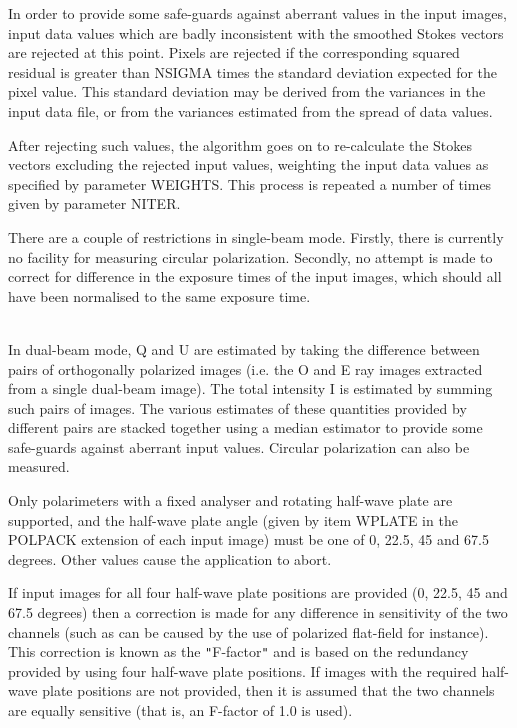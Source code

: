 \documentclass[twoside,11pt]{article}
\renewcommand{\_}{\texttt{\symbol{95}}}
\newcommand{\sstdiytopic}[2]{\item[{\hspace{-0.35em}#1\hspace{-0.35em}:}]
\mbox{} \\[1.3ex] #2}
\newcommand{\sstdiytopic}[2]{\item[{#1}] #2 }
\begin{document}
{{      In order to provide some safe-guards against aberrant values in
      the input images, input data values which are badly inconsistent
      with the smoothed Stokes vectors are rejected at this point. Pixels
      are rejected if the corresponding squared residual is greater than
      NSIGMA times the standard deviation expected for the pixel value.
      This standard deviation may be derived from the variances in the
      input data file, or from the variances estimated from the spread
      of data values.

      After rejecting such values, the algorithm goes on to re-calculate
      the Stokes vectors excluding the rejected input values, weighting
      the input data values as specified by parameter WEIGHTS. This
      process is repeated a number of times given by parameter NITER.

      There are a couple of restrictions in single-beam mode. Firstly,
      there is currently no facility for measuring circular
      polarization. Secondly, no attempt is made to correct for
      difference in the exposure times of the input images, which
      should all have been normalised to the same exposure time.
   }
   \sstdiytopic{
      The Dual-beam Algorithm
   }{
      In dual-beam mode, Q and U are estimated by taking the difference
      between pairs of orthogonally polarized images (i.e. the O and E
      ray images extracted from a single dual-beam image). The total
      intensity I is estimated by summing such pairs of images. The
      various estimates of these quantities provided by different pairs
      are stacked together using a median estimator to provide some
      safe-guards against aberrant input values. Circular polarization
      can also be measured.

      Only polarimeters with a fixed analyser and rotating half-wave plate
      are supported, and the half-wave plate angle (given by item
      WPLATE in the POLPACK extension of each input image) must be one
      of 0, 22.5, 45 and 67.5 degrees. Other values cause the
      application to abort.

      If input images for all four half-wave plate positions are
      provided (0, 22.5, 45 and 67.5 degrees) then a correction is
      made for any difference in sensitivity of the two channels (such
      as can be caused by the use of polarized flat-field for
      instance). This correction is known as the {\tt "}F-factor{\tt "} and is
      based on the redundancy provided by using four half-wave plate
      positions. If images with the required half-wave plate positions
      are not provided, then it is assumed that the two channels are
      equally sensitive (that is, an F-factor of 1.0 is used).

}}
\end{document}
